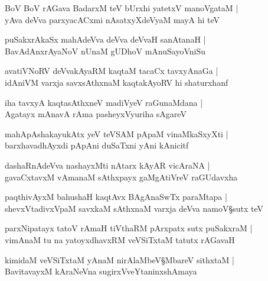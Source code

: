 \begin{shloka}
BoV BoV rAGava BadarxM teV bUrxhi yatetxV manoVgataM |\\
yAva deVva parxyacACxmi nAsatxyXdeVyaM mayA hi teV 
\end{shloka}

\begin{shloka}
puSakxrAkaSx mahAdeVva deVva deVvaH sanAtanaH |\\
BavAdAnxrAyaNoV nUnaM gUDhoV mAnuSayoVniSu 
\end{shloka}

\begin{shloka}
avatiVNoRV deVvakAyaRM kaqtaM tacaCx tavxyAnaGa |\\
idAniVM varxja savxsAthxnaM kaqtakAyoRV hi shaturxhanf
\end{shloka}

\begin{shloka}
iha tavxyA kaqtasAthxneV madiVyeV raGunaMdana |\\
Agatayx mAnavA rAma pasheyxVyuriha sAgareV 
\end{shloka}

\begin{shloka}
mahApAshakayukAtx yeV teVSAM pApaM vinaMkaSxyXti |\\
barxhavadhAyxdi pApAni duSaTxni yAni kAnicitf 
\end{shloka}

\begin{shloka}
dashaRnAdeVva nashayxMti nAtarx kAyAR vicAraNA |\\
gavaCxtavxM vAmanaM sAthxpayx gaMgAtiVreV raGUdavxha 
\end{shloka}

\begin{shloka}
paqthivAyxM bahushaH kaqtAvx BAgAnaSwTx paraMtapa |\\
shevxVtadivxVpaM savxkaM sAthxnaM varxja deVva namoV\S sutx teV 
\end{shloka}

\begin{shloka}
parxNipatayx tatoV rAmaH tiVthaRM pArxpatx sutx puSakxraM |\\
vimAnaM tu na yatoyxdhavxRM veVSiTxtaM tatutx rAGavaH 
\end{shloka}

\begin{shloka}
kimidaM veVSiTxtaM yAnaM nirAlaMbeV\S MbareV sithxtaM |\\
BavitavayxM kAraNeVna sugirxVveYtaninxshAmaya
\end{shloka}

